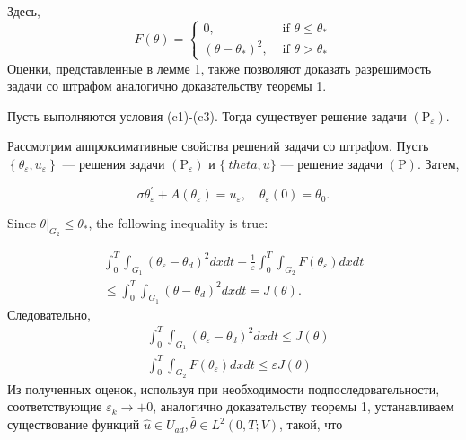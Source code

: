Здесь,
\[
    F(\theta)=
    \begin{cases}
        0, & \text { if } \theta \leq \theta_{*} \\
        \left(\theta-\theta_{*}\right)^{2},
        & \text { if } \theta>\theta_{*}
    \end{cases}
\]
Оценки, представленные в лемме 1, также позволяют доказать разрешимость
задачи со штрафом аналогично доказательству теоремы 1.

\begin{theorem}
    \label{th:3_2:2}
Пусть выполняются условия (c1)-(c3).
Тогда существует решение задачи $\left(\mathrm{P}_{\varepsilon}\right)$.
\end{theorem}

Рассмотрим аппроксимативные свойства решений задачи со штрафом.
Пусть $\left\{\theta_{\varepsilon}, u_{\varepsilon}\right\}$ — решения задачи
$\left(\mathrm{P}_{\varepsilon}\right)$ и $\{\ theta, u\}$
— решение задачи $(\mathrm{P})$.
Затем,

\begin{equation}
    \label{eq:3_2:8}
    \sigma \theta_{\varepsilon}^{\prime}
    +A\left(\theta_{\varepsilon}\right)=u_{\varepsilon},
    \quad \theta_{\varepsilon}(0)=\theta_{0}.
\end{equation}

Since $\left.\theta\right|_{G_{2}} \leq \theta_{*}$, the following inequality is true:

\[
    \begin{array}{r}
        \int_{0}^{T} \int_{G_{1}}\left(\theta_{\varepsilon}
        -\theta_{d}\right)^{2} d x d t+\frac{1}{\varepsilon}
        \int_{0}^{T} \int_{G_{2}}
        F\left(\theta_{\varepsilon}\right) d x d t \\
        \leq \int_{0}^{T} \int_{G_{1}}
        \left(\theta-\theta_{d}\right)^{2} d x d t=J(\theta).
    \end{array}
\]
Следовательно,
\[
    \begin{aligned}
        &\int_{0}^{T} \int_{G_{1}}\left(\theta_{\varepsilon}
        -\theta_{d}\right)^{2} d x d t \leq J(\theta) \\
        &\int_{0}^{T} \int_{G_{2}} F
        \left(\theta_{\varepsilon}\right) d x d t \leq \varepsilon J(\theta)
    \end{aligned}
\]
Из полученных оценок, используя при необходимости подпоследовательности,
соответствующие $\varepsilon_{k} \rightarrow+0$,
аналогично доказательству теоремы 1, устанавливаем существование
функций $\widehat{u} \in U_{a d}, \widehat{\theta} \in L^{2}(0, T ; V)$, такой, что

